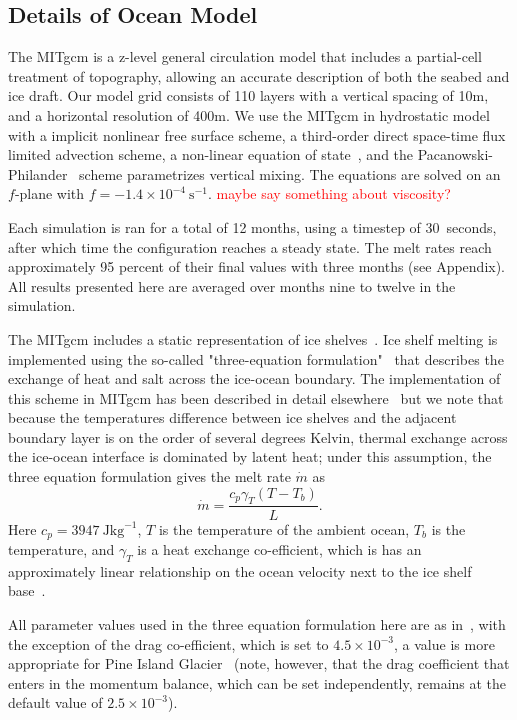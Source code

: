 \documentclass[draft]{agujournal2019}
\newcommand{\red}[1]{\textcolor{red}{#1}}
\begin{document}
\subsection{Details of Ocean Model}
The MITgcm is a z-level general circulation model that includes a partial-cell treatment of topography, allowing an accurate description of both the seabed and ice draft. Our model grid consists of 110 layers with a vertical spacing of 10m, and a horizontal resolution of 400m. We use the MITgcm in hydrostatic model with a implicit nonlinear free surface scheme, a third-order direct space-time flux limited advection scheme, a non-linear equation of state~, and the Pacanowski-Philander~\cite{Pacanowski1981JPhysOcean} scheme parametrizes vertical mixing. The equations are solved on an $f$-plane with $f = -1.4\times10^{-4}~\text{s}^{-1}$. \red{maybe say something about viscosity?}

Each simulation is ran for a total of 12 months, using a timestep of 30~\si{seconds}, after which time the configuration reaches a steady state. The melt rates reach approximately 95 percent of their final values with three months (see Appendix). All results presented here are averaged over months nine to twelve in the simulation. 

The MITgcm includes a static representation of ice shelves~\cite{Losch2008JGeophysResOceans}. Ice shelf melting is implemented using the so-called "three-equation formulation"~\cite{Holland1999JPhysOcean} that describes the exchange of heat and salt across the ice-ocean boundary. The implementation of this scheme in MITgcm has been described in detail elsewhere~\cite[for example]{DeRydt2014JGeophysResOceans,Dansereau2014JGROceans} but we note that because the temperatures difference between ice shelves and the adjacent boundary layer is on the order of several degrees Kelvin, thermal exchange across the ice-ocean interface is dominated by latent heat; under this assumption, the three equation formulation gives the melt rate $\dot{m}$ as
\begin{equation}
    \dot{m} = \frac{c_p \gamma_T (T - T_b)}{L}.
\end{equation}
Here $c_p = 3947~\si{\joule \kilogram}^{-1}$, $T$ is the temperature of the ambient ocean, $T_b$ is the temperature, and $\gamma_T$ is a heat exchange co-efficient, which is has an approximately linear relationship on the ocean velocity next to the ice shelf base~\cite{Holland1999JPhysOcean}.

All parameter values used in the three equation formulation here are as in~, with the exception of the drag co-efficient, which is set to $4.5\times10^{-3}$, a value is more appropriate for Pine Island Glacier~\cite{Dutrieux2014Science} (note, however, that the drag coefficient that enters in the momentum balance, which can be set independently, remains at the default value of $2.5\times 10^{-3}$).
\end{document}
